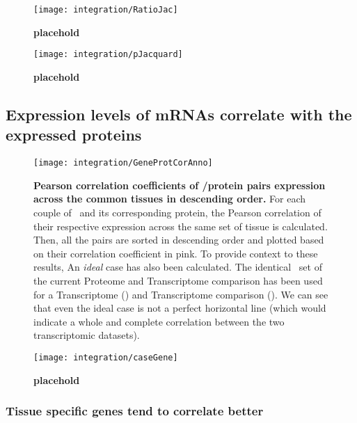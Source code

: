 \begin{figure}[!htbp]
\texttt{[image: integration/RatioJac]}\centering
    \caption[placehold]{\label{fig:RatioJac}\textbf{placehold}}
\end{figure}

\begin{figure}[!htbp]
\texttt{[image: integration/pJacquard]}\centering
    \caption[placehold]{\label{fig:pJacquard}\textbf{placehold}}
\end{figure}

\subsection{Expression levels of mRNAs correlate with the expressed proteins}

\begin{figure}[!htbp]
    \texttt{[image: integration/GeneProtCorAnno]}\centering
    \caption[Pearson correlation coefficients of \mRNA/protein pairs expression
    across the common tissues in descending order]
    {\label{GeneProtCor}\textbf{Pearson correlation coefficients of \mRNA/protein
    pairs expression across the common tissues in descending order.} For each
    couple of \mRNA\ and its corresponding protein, the Pearson correlation of
    their respective expression across the same set of tissue is calculated. Then,
    all the pairs are sorted in descending order and plotted based on their
    correlation coefficient in pink. To provide context to these results,
    An \emph{ideal} case has also been calculated. The identical \mRNAs\ set of
    the current Proteome and Transcriptome comparison has been used for a
    Transcriptome () and Transcriptome comparison
    (). We can see that even the ideal case is not a perfect
    horizontal line (which would indicate a whole and complete correlation between
    the two transcriptomic datasets).}
\end{figure}


\begin{figure}[!htbp]
\texttt{[image: integration/caseGene]}\centering
    \caption[placehold]{\label{fig:caseGene}\textbf{placehold}}
\end{figure}

\subsubsection{Tissue specific genes tend to correlate better}

